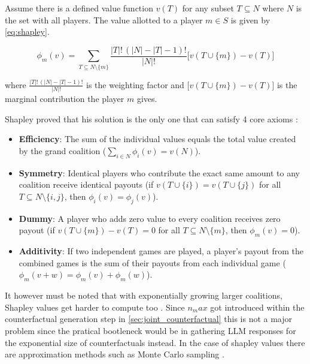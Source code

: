 Assume there is a defined value function $v(T)$ for any subset $T \subseteq N$ where $N$ is the set with all players. The value allotted to a player $m \in S$ is given by \ref{eq:shapley}.

\begin{equation}
\label{eq:shapley}
\phi_m(v) = \sum_{T \subseteq N \setminus \{m\}} \frac{|T|!\, (|N|-|T|-1)!}{|N|!} \big[ v(T \cup \{m\}) - v(T) \big]
\end{equation}

where $\frac{|T|!\, (|N|-|T|-1)!}{|N|!}$ is the weighting factor and $\big[ v(T \cup \{m\}) - v(T) \big]$ is the marginal contribution the player $m$ gives.

Shapley proved that his solution is the only one that can satisfy 4 core axioms \cite{shapley17ValueNPerson1953, mitchellSamplingPermutationsShapley2022, parcalabescuMeasuringFaithfulnessSelfconsistency2024}:
\begin{itemize}
\item \textbf{Efficiency}: The sum of the individual values equals the total value created by the grand coalition ($\sum_{i \in N} \phi_i(v) = v(N)$).
\item \textbf{Symmetry}: Identical players who contribute the exact same amount to any coalition receive identical payouts (if $v(T \cup \{i\}) = v(T \cup \{j\})$ for all $T \subseteq N \setminus \{i, j\}$, then \(\phi_i(v) = \phi_j(v)\)).
\item \textbf{Dummy}: A player who adds zero value to every coalition receives zero payout (if $v(T \cup \{m\}) - v(T) = 0$ for all $T \subseteq N \setminus \{m\}$, then $\phi_m(v) = 0$).
\item \textbf{Additivity}: If two independent games are played, a player’s payout from the combined games is the sum of their payouts from each individual game ($\phi_m(v + w) = \phi_m(v) + \phi_m(w)$).
\end{itemize}

It however must be noted that with exponentially growing larger coalitions, Shapley values get harder to compute too \cite{parcalabescuMeasuringFaithfulnessSelfconsistency2024}. Since $n_max$ got introduced within the counterfactual generation step in \ref{sec:joint_counterfactual} this is not a major problem since the pratical bootleneck would be in gathering LLM responses for the exponential size of counterfactuals instead. In the case of shapley values there are approximation methods such as Monte Carlo sampling \cite{mitchellSamplingPermutationsShapley2022}.

